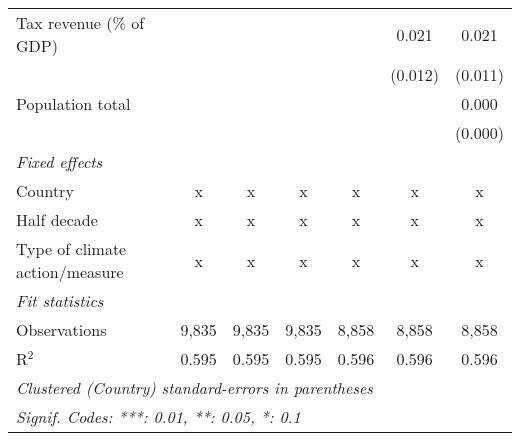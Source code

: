 \begin{tabular}{lcccccc}
   Tax revenue (\% of GDP)                                        &               &                &               &               & 0.021         & 0.021\\   
                                                                  &               &                &               &               & (0.012)       & (0.011)\\   
   Population total                                               &               &                &               &               &               & 0.000\\   
                                                                  &               &                &               &               &               & (0.000)\\   
   \emph{Fixed effects}\\
   Country                                                        & x             & x              & x             & x             & x             & x\\  
   Half decade                                                    & x             & x              & x             & x             & x             & x\\  
   Type of climate action/measure                                 & x             & x              & x             & x             & x             & x\\  
   \midrule \emph{Fit statistics}\\
   Observations                                                   & 9,835         & 9,835          & 9,835         & 8,858         & 8,858         & 8,858\\  
   R$^2$                                                          & 0.595         & 0.595          & 0.595         & 0.596         & 0.596         & 0.596\\  
   \midrule
   \multicolumn{7}{l}{\emph{Clustered (Country) standard-errors in parentheses}}\\
   \multicolumn{7}{l}{\emph{Signif. Codes: ***: 0.01, **: 0.05, *: 0.1}}\\
\end{tabular}
\par\endgroup


